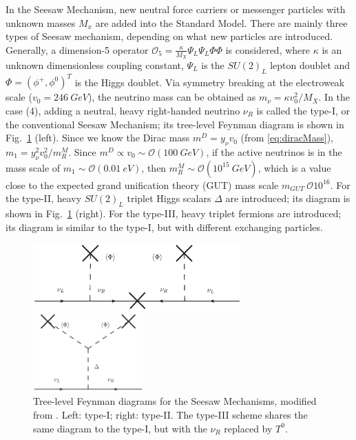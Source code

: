 In the Seesaw Mechanism, new neutral force carriers or messenger particles with unknown masses $M_x$ are added into the Standard Model. There are mainly three types of Seesaw mechanism, depending on what new particles are introduced.  Generally, a dimension-5 operator $\mathcal{O}_5=\frac{\kappa}{M_X}\Psi_{L}\Psi_{L}\Phi\Phi$ is considered, where $\kappa$ is an unknown dimensionless coupling constant, $\Psi_{L}$ is the $SU(2)_L$ lepton doublet and $\Phi=(\phi^+,\phi^0)^T$ is the Higgs doublet\cite{barger2012physics}. Via symmetry breaking at the electroweak scale ($v_0=246~GeV$), the neutrino mass can be obtained as $m_\nu=\kappa v_0^2/M_X$. In the case (4), adding a neutral, heavy right-handed neutrino $\nu_R$ is called the type-I, or the conventional Seesaw Mechanism; its tree-level Feynman diagram is shown in Fig.~\ref{seesaw} (left).
Since we know the Dirac mass $m^D=y_\nu v_0$ (from \ref{eq:diracMass}), $m_1=y^2_\nu v_0^2/m^M_R$. Since $m^D\propto v_0\sim\mathcal{O}(100~GeV)$, if the active neutrinos is in the mass scale of $m_1\sim\mathcal{O}(0.01~eV)$, then $m^M_R\sim\mathcal{O}(10^{15}~GeV)$, which is a value close to the expected grand unification theory (GUT) mass scale $m_{GUT}~\mathcal{O}10^{16}$. For the type-II, heavy $SU(2)_L$ triplet Higgs scalars $\Delta$ are introduced; its diagram is shown in Fig.~\ref{seesaw} (right). For the type-III, heavy triplet fermions are introduced; its diagram is similar to the type-I, but with different exchanging particles.

\begin{figure}[htbp]
	\centering	
	\begin{minipage}[t]{0.6\textwidth}
		\includegraphics[width=8cm]{typeI_seesaw.eps}
	\end{minipage}
	\begin{minipage}[t]{0.3\textwidth}
		\includegraphics[height=3.0cm]{typeIIseesaw.eps}
	\end{minipage}
	\caption{ Tree-level Feynman diagrams for the Seesaw Mechanisms, modified from \cite{valle2015neutrinos}. Left: type-I; right: type-II. The type-III scheme shares the same diagram to the type-I, but with the $\nu_R$ replaced by $T^0$.}
	\label{seesaw}
\end{figure}

